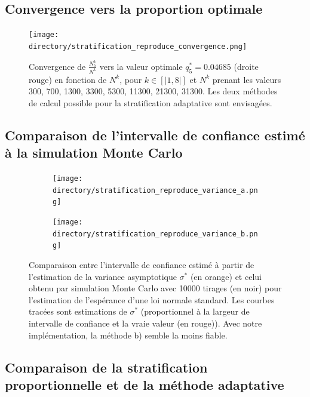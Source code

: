 \documentclass[12pt,a4paper]{report}
\def \directory {/home/jonathan/Programmation/C++/Projet_C++_S2/Images}
\begin{document}
\subsection{Convergence vers la proportion optimale}

\begin{figure}[H]
\centering
	\texttt{[image: \\directory/stratification\_reproduce\_convergence.png]}
	
\caption{\small Convergence de $\frac{N^{k}_{5}}{N^{k}}$ vers la valeur optimale $q_{5}^{*} = 0.04685$ (droite rouge) en fonction de $N^{k}$, pour $k \in [|1,8|]$ et $N^{k}$ prenant les valeurs 300, 700, 1300, 3300, 5300, 11300, 21300, 31300. Les deux méthodes de calcul possible pour la stratification adaptative sont envisagées.}
\label{fig:strat_convergence_proportion}
\end{figure}

\subsection{Comparaison de l'intervalle de confiance estimé à la simulation Monte Carlo}

\begin{figure}[H]
\centering
	\begin{subfigure}[scale=1]{0.45\textwidth}
			\texttt{[image: \\directory/stratification\_reproduce\_variance\_a.png]}
	\end{subfigure}
	\hfill
	\begin{subfigure}[scale=1]{0.45\textwidth}
		\texttt{[image: \\directory/stratification\_reproduce\_variance\_b.png]}
	\end{subfigure}

	
\caption{\small Comparaison entre l'intervalle de confiance estimé à partir de l'estimation de la variance asymptotique $\sigma^{*}$ (en orange) et celui obtenu par simulation Monte Carlo avec 10000 tirages (en noir) pour l'estimation de l'espérance d'une loi normale standard. Les courbes tracées sont estimations de $\sigma^{*}$ (proportionnel à la largeur de intervalle de confiance et la vraie valeur (en rouge)). Avec notre implémentation, la méthode b) semble la moins fiable.}
\label{fig:strat_comparaison_sigma}
\end{figure}

\subsection{Comparaison de la stratification proportionnelle et de la méthode adaptative}
\end{document}

